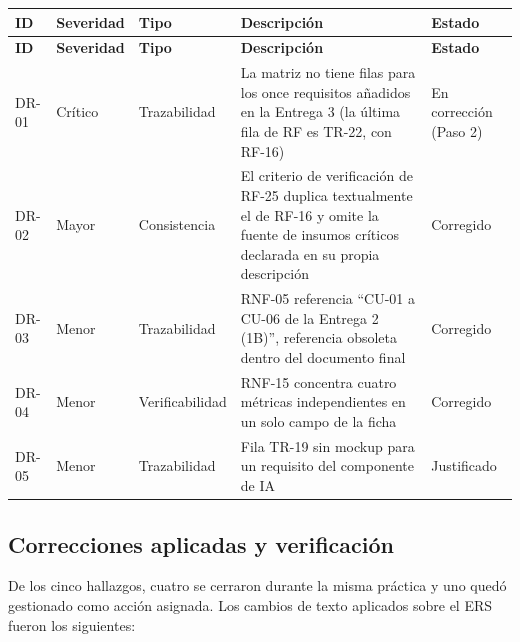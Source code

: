 \begin{center}
\begin{longtable}{|p{1.2cm}|p{1.7cm}|p{2.2cm}|p{6.3cm}|p{2.2cm}|}
\hline
\textbf{ID} & \textbf{Severidad} & \textbf{Tipo} & \textbf{Descripción} & \textbf{Estado} \\
\hline
\endfirsthead
\hline
\textbf{ID} & \textbf{Severidad} & \textbf{Tipo} & \textbf{Descripción} & \textbf{Estado} \\
\hline
\endhead
\hline
\endfoot
\hline
\endlastfoot
DR-01 & Crítico & Trazabilidad & La matriz no tiene filas para los once requisitos añadidos en la Entrega 3 (la última fila de RF es TR-22, con RF-16) & En corrección (Paso 2) \\
\hline
DR-02 & Mayor & Consistencia & El criterio de verificación de RF-25 duplica textualmente el de RF-16 y omite la fuente de insumos críticos declarada en su propia descripción & Corregido \\
\hline
DR-03 & Menor & Trazabilidad & RNF-05 referencia ``CU-01 a CU-06 de la Entrega 2 (1B)'', referencia obsoleta dentro del documento final & Corregido \\
\hline
DR-04 & Menor & Verificabilidad & RNF-15 concentra cuatro métricas independientes en un solo campo de la ficha & Corregido \\
\hline
DR-05 & Menor & Trazabilidad & Fila TR-19 sin mockup para un requisito del componente de IA & Justificado \\
\hline
\end{longtable}
\label{tab:hallazgos-reinspeccion}
\end{center}

\subsection{Correcciones aplicadas y verificación}
\label{sec:correcciones-reinspeccion}

De los cinco hallazgos, cuatro se cerraron durante la misma práctica y uno quedó gestionado como acción asignada. Los cambios de texto aplicados sobre el ERS fueron los siguientes:

